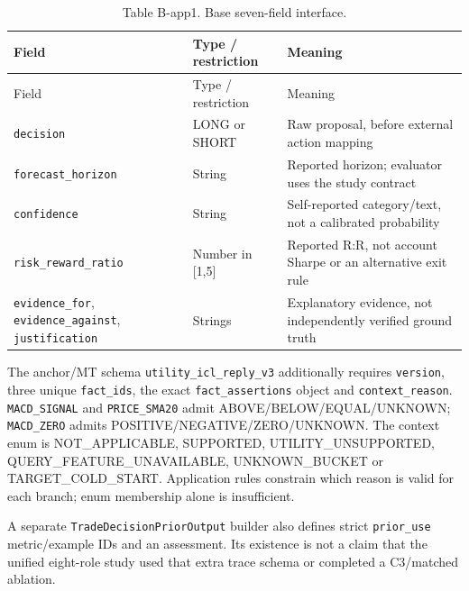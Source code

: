 \begin{longtable}[]{@{}
  >{\raggedright\arraybackslash}p{}
  >{\raggedright\arraybackslash}p{}
  >{\raggedright\arraybackslash}p{}@{}}
\caption{Table B-app1. Base seven-field interface.}\label{tab:B_prompts:3}\tabularnewline
\toprule\noalign{}
Field
 & Type / restriction
 & Meaning
 \\
\midrule\noalign{}
\endfirsthead
\toprule\noalign{}
Field
 & Type / restriction
 & Meaning
 \\
\midrule\noalign{}
\endhead
\bottomrule\noalign{}
\endlastfoot
\texttt{decision} & LONG or SHORT & Raw proposal, before external action mapping \\
\texttt{forecast\_\allowbreak{}horizon} & String & Reported horizon; evaluator uses the study contract \\
\texttt{confidence} & String & Self-reported category/text, not a calibrated probability \\
\texttt{risk\_\allowbreak{}reward\_\allowbreak{}ratio} & Number in {[}1,5{]} & Reported R:R, not account Sharpe or an alternative exit rule \\
\texttt{evidence\_\allowbreak{}for}, \texttt{evidence\_\allowbreak{}against}, \texttt{justification} & Strings & Explanatory evidence, not independently verified ground truth \\
\end{longtable}

\endgroup

The anchor/MT schema \texttt{utility\_\allowbreak{}icl\_\allowbreak{}reply\_\allowbreak{}v3} additionally requires
\texttt{version}, three unique \texttt{fact\_\allowbreak{}ids}, the exact \texttt{fact\_\allowbreak{}assertions} object and
\texttt{context\_\allowbreak{}reason}. \texttt{MACD\_\allowbreak{}SIGNAL} and \texttt{PRICE\_\allowbreak{}SMA20} admit
ABOVE/BELOW/EQUAL/UNKNOWN; \texttt{MACD\_\allowbreak{}ZERO} admits
POSITIVE/NEGATIVE/ZERO/UNKNOWN. The context enum is NOT\_\allowbreak{}APPLICABLE,
SUPPORTED, UTILITY\_\allowbreak{}UNSUPPORTED, QUERY\_\allowbreak{}FEATURE\_\allowbreak{}UNAVAILABLE, UNKNOWN\_\allowbreak{}BUCKET
or TARGET\_\allowbreak{}COLD\_\allowbreak{}START. Application rules constrain which reason is valid
for each branch; enum membership alone is insufficient.

A separate \texttt{TradeDecisionPriorOutput} builder also defines strict
\texttt{prior\_\allowbreak{}use} metric/example IDs and an assessment. Its existence is not a
claim that the unified eight-role study used that extra trace schema or
completed a C3/matched ablation.

